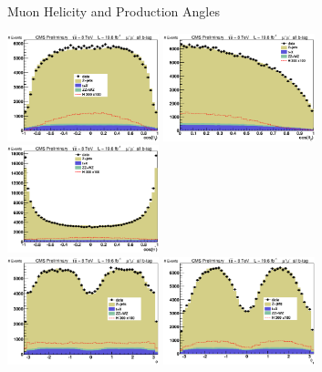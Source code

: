\begin{frame}{Muon Helicity and Production Angles}
\begin{center}
\includegraphics[width=0.33\textwidth]{images/preselection/mu/costheta1.eps}
\includegraphics[width=0.33\textwidth]{images/preselection/mu/costheta2.eps}
\includegraphics[width=0.33\textwidth]{images/preselection/mu/costhetast.eps}
\\
\includegraphics[width=0.33\textwidth]{images/preselection/mu/phi.eps}
\includegraphics[width=0.33\textwidth]{images/preselection/mu/phi1.eps}

\end{center}
\end{frame}




